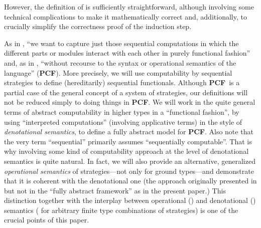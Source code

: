 \documentclass[fleqn]{LMCS}
\theoremstyle{plain}\newtheorem{satz}[thm]{Satz}
\theoremstyle{plain}\newtheorem{hyp}[thm]{Hypothesis}
\theoremstyle{plain}\newtheorem{hyps}[thm]{Hypotheses}
\theoremstyle{definition}\newtheorem{note}[thm]{Note}
\newcommand{\PCF}{\mbox{\bf PCF}}
\newcommand{\?}{\mbox{?}}
\begin{document}
However, the definition of  is sufficiently straightforward, although involving 
some technical complications to make it mathematically correct and, additionally, 
to crucially simplify the correctness proof of the induction step. 

As in \cite{Abramsky-Jagadeesan2000}, ``we want to capture just those 
sequential computations in which the different parts 
or modules interact with each other in purely functional 
fashion'' and, as in \cite{Hyland-Ong2000}, ``without 
recourse to the syntax or operational semantics 
of the language'' (\PCF). More precisely, 
we will use computability by sequential strategies to define (hereditarily) 
sequential functionals. 
Although  
\PCF\ is a partial case of the general concept of a system 
of strategies, our definitions will not be reduced simply to doing things in \PCF. 
We will work in the quite general 
terms of abstract computability in higher types 
in a ``functional fashion'', by using ``interpreted computations'' 
(involving applicative terms) in the style of \emph{denotational semantics},
to define a fully abstract 
model for \PCF. 
Also note that the very term ``sequential'' primarily assumes 
``sequentially computable''. That is why involving some kind of 
computability approach 
at the level of denotational semantics is quite natural. In fact, we 
will also provide an alternative, generalized \emph{operational semantics} 
of strategies---not only for ground types---and 
demonstrate that it is coherent with the denotational one (the approach 
originally presented in \cite{Saz76SMZH} 
but not in the ``fully abstract framework'' 
as in the present paper.)
This distinction together with the interplay 
between operational () and denotational () semantics 
( for arbitrary finite type combinations of strategies) 
is one of the crucial points 
of this paper. 
\end{document}
